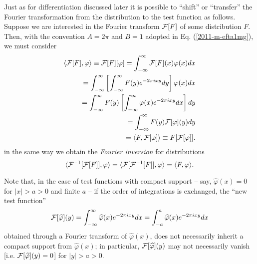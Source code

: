 Just as for differentiation discussed later it is possible to ``shift'' or ``transfer'' the
Fourier transformation from the distribution to the test function
as follows.
Suppose we are interested in the Fourier transform ${\cal F}[F]$ of some distribution $F$.
Then, with the convention
 $A=2\pi $ and $B=1$  adopted in Eq. (\ref{2011-m-efta1mg}), we must consider
\begin{equation}
\begin{split}
\langle  {\cal F}[F ], \varphi \rangle \equiv {\cal F}[F ][\varphi ]
=
\int_{-\infty}^\infty {\cal F}[F](x) \varphi (x) dx
\\ \qquad =
\int_{-\infty}^\infty \left[ \int_{-\infty}^\infty F(y) e^{- 2\pi ixy} dy \right] \varphi (x) dx
\\ \qquad =
\int_{-\infty}^\infty  F(y)  \left[ \int_{-\infty}^\infty \varphi (x) e^{- 2\pi ixy}  dx \right] dy
\\ \qquad =
\int_{-\infty}^\infty  F(y)  {\cal F}[ \varphi ](y) dy
\\ \qquad =
\langle  F , {\cal F}[\varphi ]\rangle \equiv F [{\cal F}[\varphi ]]
.
\end{split}
\end{equation}
in the same way we obtain the
{\em Fourier inversion}
for distributions
\begin{equation}
\langle   {\cal F}^{-1}[{\cal F}[F ]], \varphi \rangle
=
\langle   {\cal F}[{\cal F}^{-1}[F ]], \varphi \rangle
=
\langle    F  , \varphi \rangle
.
\end{equation}

Note that, in the case of test functions with compact support -- say, $\widehat{\varphi} (x) = 0$ for $\vert x \vert > a > 0$ and finite $a$
--  if the order of integrations is exchanged, the ``new test function''
\begin{equation}
{\cal F}[ \widehat{\varphi}] (y)=
\int_{-\infty}^\infty  \widehat{\varphi} (x) e^{- 2\pi ixy}  dx
=
\int_{-a}^a  \widehat{\varphi} (x) e^{- 2\pi ixy}  dx
\end{equation}
obtained through a Fourier transform of  $\widehat{\varphi} (x)$,
does not necessarily inherit a compact support  from $\widehat{\varphi} (x)$;
in particular,
${\cal F}[ \widehat{\varphi}] (y)$
may not necessarily vanish [i.e.  ${\cal F}[ \widehat{\varphi}] (y) = 0$] for $\vert y \vert > a > 0$.


